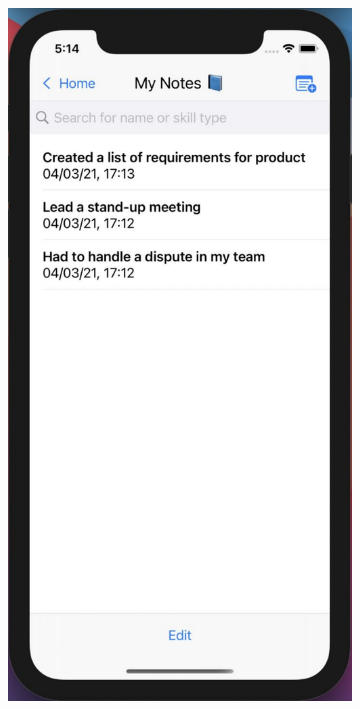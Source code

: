 \documentclass{l4proj}
\begin{document}
\begin{figure}
    ~ %
    \begin{subfigure}[b]{0.3\textwidth}
        \includegraphics[scale=0.25]{images/appNotesScreen.pdf}

\end{subfigure}
\end{figure}
\end{document}
